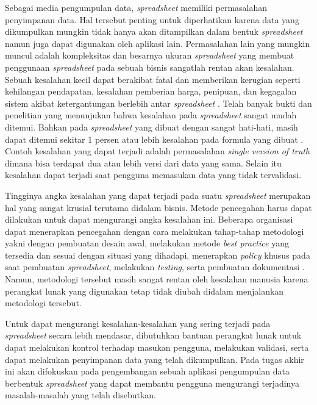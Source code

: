 Sebagai media pengumpulan data, \textit{spreadsheet} memiliki permasalahan penyimpanan data. Hal tersebut penting untuk diperhatikan karena data yang dikumpulkan mungkin tidak hanya akan ditampilkan dalam bentuk \textit{spreadsheet} namun juga dapat digunakan oleh aplikasi lain. Permasalahan lain yang mungkin muncul adalah kompleksitas dan besarnya ukuran \textit{spreadsheet} yang membuat penggunaan \textit{spreadsheet} pada sebuah bisnis sangatlah rentan akan kesalahan. Sebuah kesalahan kecil dapat berakibat fatal dan memberikan kerugian seperti kehilangan pendapatan, kesalahan pemberian harga, penipuan, dan kegagalan sistem akibat ketergantungan berlebih antar \textit{spreadsheet} \citep{EUSPRIGAbout}. Telah banyak bukti dan penelitian yang menunjukan bahwa kesalahan pada \textit{spreadsheet} sangat mudah ditemui. Bahkan pada \textit{spreadsheet} yang dibuat dengan sangat hati-hati, masih dapat ditemui sekitar 1 persen atau lebih kesalahan pada formula yang dibuat \citep{Panko1998}. Contoh kesalahan yang dapat terjadi adalah permasalahan \textit{single version of truth} dimana bisa terdapat dua atau lebih versi dari data yang sama. Selain itu kesalahan dapat terjadi saat pengguna memasukan data yang tidak tervalidasi.

Tingginya angka kesalahan yang dapat terjadi pada suatu \textit{spreadsheet} merupakan hal yang sangat krusial terutama didalam bisnis. Metode pencegahan harus dapat dilakukan untuk dapat mengurangi angka kesalahan ini. Beberapa organisasi dapat menerapkan pencegahan dengan cara melakukan tahap-tahap metodologi yakni dengan pembuatan desain awal, melakukan metode \textit{best practice} yang tersedia dan sesuai dengan situasi yang dihadapi, menerapkan \textit{policy} khusus pada saat pembuatan \textit{spreadsheet}, melakukan \textit{testing}, serta pembuatan dokumentasi \citep{EUSPRIGBestPractice}. Namun, metodologi tersebut masih sangat rentan oleh kesalahan manusia karena perangkat lunak yang digunakan tetap tidak diubah didalam menjalankan metodologi tersebut.

Untuk dapat mengurangi kesalahan-kesalahan yang sering terjadi pada \textit{spreadsheet} secara lebih mendasar, dibutuhkan bantuan perangkat lunak untuk dapat melakukan kontrol terhadap masukan pengguna, melakukan validasi, serta dapat melakukan penyimpanan data yang telah dikumpulkan. Pada tugas akhir ini akan difokuskan pada pengembangan sebuah aplikasi pengumpulan data berbentuk \textit{spreadsheet} yang dapat membantu pengguna mengurangi terjadinya masalah-masalah yang telah disebutkan.

